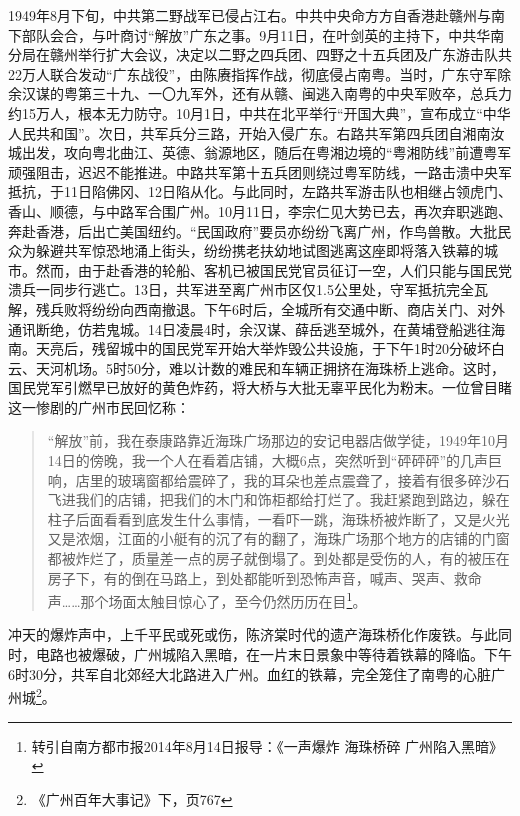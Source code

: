 1949年8月下旬，中共第二野战军已侵占江右。中共中央命方方自香港赴赣州与南下部队会合，与叶商讨“解放”广东之事。9月11日，在叶剑英的主持下，中共华南分局在赣州举行扩大会议，决定以二野之四兵团、四野之十五兵团及广东游击队共22万人联合发动“广东战役”，由陈赓指挥作战，彻底侵占南粤。当时，广东守军除余汉谋的粤第三十九、一〇九军外，还有从赣、闽逃入南粤的中央军败卒，总兵力约15万人，根本无力防守。10月1日，中共在北平举行“开国大典”，宣布成立“中华人民共和国”。次日，共军兵分三路，开始入侵广东。右路共军第四兵团自湘南汝城出发，攻向粤北曲江、英德、翁源地区，随后在粤湘边境的“粤湘防线”前遭粤军顽强阻击，迟迟不能推进。中路共军第十五兵团则绕过粤军防线，一路击溃中央军抵抗，于11日陷佛冈、12日陷从化。与此同时，左路共军游击队也相继占领虎门、香山、顺德，与中路军合围广州。10月11日，李宗仁见大势已去，再次弃职逃跑、奔赴香港，后出亡美国纽约。“民国政府”要员亦纷纷飞离广州，作鸟兽散。大批民众为躲避共军惊恐地涌上街头，纷纷携老扶幼地试图逃离这座即将落入铁幕的城市。然而，由于赴香港的轮船、客机已被国民党官员征订一空，人们只能与国民党溃兵一同步行逃亡。13日，共军进至离广州市区仅1.5公里处，守军抵抗完全瓦解，残兵败将纷纷向西南撤退。下午6时后，全城所有交通中断、商店关门、对外通讯断绝，仿若鬼城。14日凌晨4时，余汉谋、薛岳逃至城外，在黄埔登船逃往海南。天亮后，残留城中的国民党军开始大举炸毁公共设施，于下午1时20分破坏白云、天河机场。5时50分，难以计数的难民和车辆正拥挤在海珠桥上逃命。这时，国民党军引燃早已放好的黄色炸药，将大桥与大批无辜平民化为粉末。一位曾目睹这一惨剧的广州市民回忆称：

\begin{quote}

“解放”前，我在泰康路靠近海珠广场那边的安记电器店做学徒，1949年10月14日的傍晚，我一个人在看着店铺，大概6点，突然听到“砰砰砰”的几声巨响，店里的玻璃窗都给震碎了，我的耳朵也差点震聋了，接着有很多碎沙石飞进我们的店铺，把我们的木门和饰柜都给打烂了。我赶紧跑到路边，躲在柱子后面看看到底发生什么事情，一看吓一跳，海珠桥被炸断了，又是火光又是浓烟，江面的小艇有的沉了有的翻了，海珠广场那个地方的店铺的门窗都被炸烂了，质量差一点的房子就倒塌了。到处都是受伤的人，有的被压在房子下，有的倒在马路上，到处都能听到恐怖声音，喊声、哭声、救命声……那个场面太触目惊心了，至今仍然历历在目\footnote{转引自南方都市报2014年8月14日报导：《一声爆炸 海珠桥碎 广州陷入黑暗》}。

\end{quote}
	
冲天的爆炸声中，上千平民或死或伤，陈济棠时代的遗产海珠桥化作废铁。与此同时，电路也被爆破，广州城陷入黑暗，在一片末日景象中等待着铁幕的降临。下午6时30分，共军自北郊经大北路进入广州。血红的铁幕，完全笼住了南粤的心脏广州城\footnote{《广州百年大事记》下，页767}。

